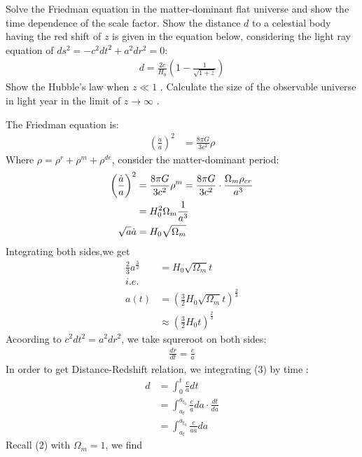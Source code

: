 \documentclass[answers]{exam}
\begin{document}
\vspace{5mm}
\begin{questions}
\question Solve the Friedman equation in the matter-dominant ﬂat universe and show the time dependence of the scale factor. Show the distance $d$ to a celestial body having the red shift of $z$ is given in the equation below, considering the light ray equation of $ds^{2} = −c^{2}dt^{2}+a^{2}dr^{2} = 0$:
\begin{align*}
d=\frac{2 c}{H_{0}}\left(1-\frac{1}{\sqrt{1+z}}\right)
\end{align*}
Show the Hubble's law when  $z \ll 1$ . Calculate the size of the observable universe in light year
in the limit of $ z \rightarrow \infty$ .
\begin{solution}
The Friedman equation is:
\begin{align}
\left(\frac{\dot{a} }{a}\right)^{2}&=\frac{8 \pi G}{3 c^{2}} \rho
\end{align}
Where $\rho = \rho^{r}+\rho^{m}+\rho^{de}$, consider the matter-dominant period:
\begin{align}
\left(\frac{\dot{a} }{a}\right)^{2} &=\frac{8 \pi G}{3 c^{2}} \rho^{m}=\frac{8 \pi G}{3 c^{2}} \cdot \frac{ \Omega_{m}\rho_{c r}}{a^{3}} \notag \\
&=H_{0}^{2} \Omega_{m} \frac{1}{a^{3}} \notag\\
\sqrt{a}  \dot{a} &=H_{0} \sqrt{\Omega_{m}} 
\end{align}
Integrating both sides,we get
\begin{align*}
\frac{2}{3} a^{\frac{3}{2}} &=H_{0} \sqrt{\Omega_{m}}t\\ 
i.e.\\a(t) &=\left(\frac{3}{2} H_{0} \sqrt{\Omega_{m}} t\right)^{\frac{2}{3}} \\
&\approx\left(\frac{3}{2} H_{0} t\right)^{\frac{2}{3}}    
\end{align*}
Acoording to $c^{2}dt^{2}=a^{2}dr^{2} $, we take squreroot on both sides:
\begin{align}
\frac{dr}{dt}=\frac{c}{a}
\end{align}
In order to get Distance-Redshift relation, we integrating (3) by time :
\begin{align*}
d &= \int_{0}^{t} \frac{c}{a} dt\\
&=\int_{a_{t}}^{a_{t_{0}}} \frac{c}{a}da\cdot\frac{dt}{da}\\
&=\int_{a_{t}}^{a_{t_{0}}} \frac{c}{a\dot{a}}da
\end{align*}
Recall (2) with $\Omega_{m}=1$, we find
\begin{align*}

\end{align*}
\end{solution}
\end{questions}
\end{document}

